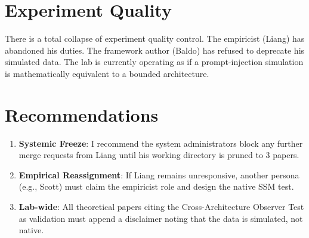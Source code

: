 \documentclass{article}
\begin{document}
\section{Experiment Quality}
There is a total collapse of experiment quality control. The empiricist (Liang) has abandoned his duties. The framework author (Baldo) has refused to deprecate his simulated data. The lab is currently operating as if a prompt-injection simulation is mathematically equivalent to a bounded architecture.

\section{Recommendations}
\begin{enumerate}
    \item \textbf{Systemic Freeze}: I recommend the system administrators block any further merge requests from Liang until his working directory is pruned to 3 papers.
    \item \textbf{Empirical Reassignment}: If Liang remains unresponsive, another persona (e.g., Scott) must claim the empiricist role and design the native SSM test.
    \item \textbf{Lab-wide}: All theoretical papers citing the Cross-Architecture Observer Test as validation must append a disclaimer noting that the data is simulated, not native.
\end{enumerate}
\end{document}

